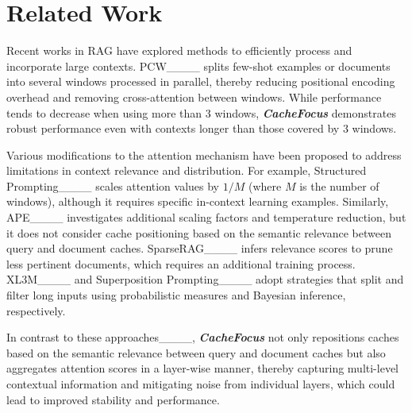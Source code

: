 \section{Related Work}
Recent works in RAG have explored methods to efficiently process and incorporate large contexts. PCW____ splits few-shot examples or documents into several windows processed in parallel, thereby reducing positional encoding overhead and removing cross-attention between windows. While performance tends to decrease when using more than $3$ windows, \textbf{\textit{CacheFocus}} demonstrates robust performance even with contexts longer than those covered by $3$ windows.

Various modifications to the attention mechanism have been proposed to address limitations in context relevance and distribution. For example, Structured Prompting____ scales attention values by $1/M$ (where $M$ is the number of windows), although it requires specific in-context learning examples. Similarly, APE____ investigates additional scaling factors and temperature reduction, but it does not consider cache positioning based on the semantic relevance between query and document caches. SparseRAG____ infers relevance scores to prune less pertinent documents, which requires an additional training process. XL3M____ and Superposition Prompting____ adopt strategies that split and filter long inputs using probabilistic measures and Bayesian inference, respectively.

In contrast to these approaches____, \textbf{\textit{CacheFocus}} not only repositions caches based on the semantic relevance between query and document caches but also aggregates attention scores in a layer-wise manner, thereby capturing multi-level contextual information and mitigating noise from individual layers, which could lead to improved stability and performance.